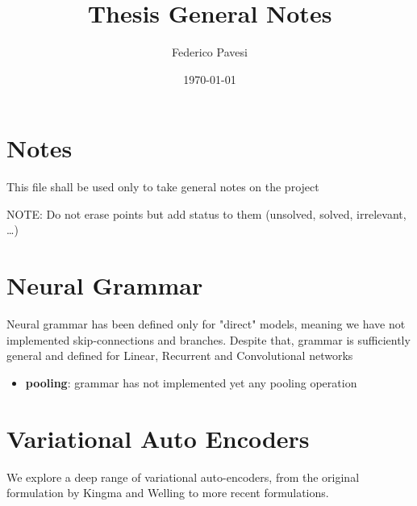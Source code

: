 \documentclass[12pt]{article}
\title{Thesis General Notes}
\author{Federico Pavesi}
\date{\today}
\begin{document}
\maketitle

\section{Notes}

This file shall be used only to take general notes on the project

NOTE: Do not erase points but add status to them (unsolved, solved, irrelevant, \ldots)



\section{Neural Grammar} 
Neural grammar has been defined only for "direct" models, meaning 
we have not implemented skip-connections and branches. Despite that, grammar is sufficiently general and 
defined for Linear, Recurrent and Convolutional networks

\begin{itemize}
    \item \textbf{pooling}: grammar has not implemented yet any pooling operation
\end{itemize}

\section{Variational Auto Encoders}
We explore a deep range of variational auto-encoders, from the original formulation by Kingma and Welling to
more recent formulations. 
\end{document}

